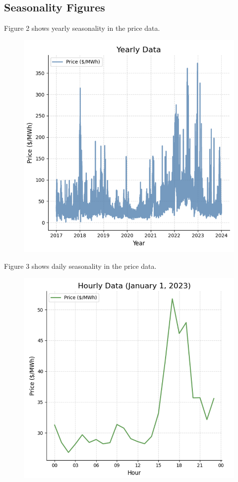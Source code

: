 \documentclass[9pt,a4paper,twoside]{rho}
\begin{document}
\subsection*{Seasonality Figures}
Figure 2 shows yearly seasonality in the price data.
\begin{figure}[H]
	\centering
	\includegraphics[width=0.8\columnwidth]{Figures/YearlySeasonality.png}
\end{figure}
            
Figure 3 shows daily seasonality in the price data.
\begin{figure}[H]
	\centering
	\includegraphics[width=0.8\columnwidth]{Figures/DailySeasonality.png}
\end{figure}
            
\end{document}
